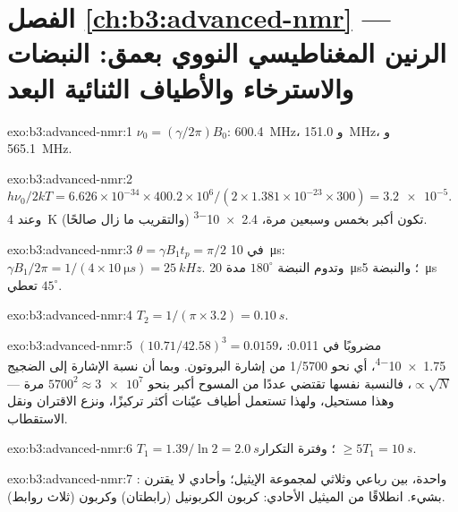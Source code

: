 \section*{الفصل \ref{ch:b3:advanced-nmr} --- الرنين المغناطيسي النووي بعمق: النبضات والاسترخاء والأطياف الثنائية البعد}

\begin{solution}{exo:b3:advanced-nmr:1}
$\nu_0 = (\gamma/2\pi)B_0$:  \qty{600.4}{MHz}، و \qty{151.0}{MHz}، و
\qty{565.1}{MHz}.
\end{solution}

\begin{solution}{exo:b3:advanced-nmr:2}
$h\nu_0/2kT = 6.626\times10^{-34} \times 400.2\times10^6/(2 \times 1.381\times10^{-23} \times 300)
= \num{3.2e-5}$. وعند \qty{4}{K} تكون أكبر بخمس وسبعين مرة، \num{2.4e-3} (والتقريب
ما زال صالحًا).
\end{solution}

\begin{solution}{exo:b3:advanced-nmr:3}
$\theta = \gamma B_1t_p = \pi/2$ في \qty{10}{\micro s}: $\gamma B_1/2\pi = 1/(4 \times
\qty{10}{\micro s}) = \qty{25}{kHz}$. وتدوم النبضة $180^\circ$ مدة \qty{20}{\micro s}؛ والنبضة \qty{5}{\micro s}
تعطي $45^\circ$.
\end{solution}

\begin{solution}{exo:b3:advanced-nmr:4}
$T_2 = 1/(\pi \times 3.2) = \qty{0.10}{s}$.
\end{solution}

\begin{solution}{exo:b3:advanced-nmr:5}
$(10.71/42.58)^3 = 0.0159$، مضروبًا في 0.011: \num{1.75e-4}، أي نحو 1/5700 من إشارة
البروتون. وبما أن نسبة الإشارة إلى الضجيج $\propto\sqrt N$، فالنسبة نفسها تقتضي عددًا من المسوح أكبر بنحو $5700^2 \approx \num{3e7}$
مرة --- وهذا مستحيل، ولهذا تستعمل أطياف  عيّنات أكثر تركيزًا،
ونزع الاقتران ونقل الاستقطاب.
\end{solution}

\begin{solution}{exo:b3:advanced-nmr:6}
$T_1 = 1.39/\ln2 = \qty{2.0}{s}$؛ وفترة التكرار $\ge 5T_1 = \qty{10}{s}$.
\end{solution}

\begin{solution}{exo:b3:advanced-nmr:7}
:  واحدة، بين رباعي  وثلاثي  لمجموعة
الإيثيل؛ وأحادي  لا يقترن بشيء.  انطلاقًا من الميثيل الأحادي:
كربون الكربونيل (رابطتان) وكربون  (ثلاث روابط).
\end{solution}

